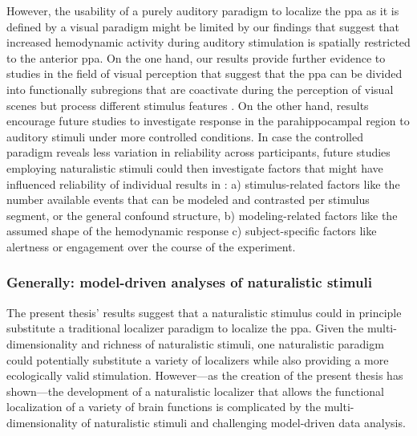 
%
However, the usability of a purely auditory paradigm to localize the \ac{ppa} as
it is defined by a visual paradigm might be limited by our findings that suggest
that increased hemodynamic activity during auditory stimulation is spatially
restricted to the anterior \ac{ppa}.
%
On the one hand, our results provide further evidence to studies in the field of
visual perception that suggest that the \ac{ppa} can be divided into
functionally subregions that are coactivate during the perception of visual
scenes but process different stimulus features
\citep{aminoff2007parahippocampal, baldassano2013differential}.
%
On the other hand, results encourage future studies to investigate response in
the parahippocampal region to auditory stimuli under more controlled conditions.
%
In case the controlled paradigm reveals less variation in reliability across
participants, future studies employing naturalistic stimuli could then
investigate factors that might have influenced reliability of individual results
in \citet{haeusler2022processing}:
%
a) stimulus-related factors like the number available events that can be modeled
and contrasted per stimulus segment, or the general confound structure,
%
b) modeling-related factors like the assumed shape of the hemodynamic response
%
c) subject-specific factors like alertness or engagement over the course of the
experiment.


\subsubsection{Generally: model-driven analyses of naturalistic stimuli}


%
The present thesis' results suggest that a naturalistic stimulus could in
principle substitute a traditional localizer paradigm to localize the \ac{ppa}.
%
Given the multi-dimensionality and richness of naturalistic stimuli, one
naturalistic paradigm could potentially substitute a variety of localizers while
also providing a more ecologically valid stimulation.
%
However---as the creation of the present thesis has shown---the development of a
naturalistic localizer that allows the functional localization of a variety of
brain functions is complicated by the multi-dimensionality of naturalistic
stimuli and challenging model-driven data analysis.


